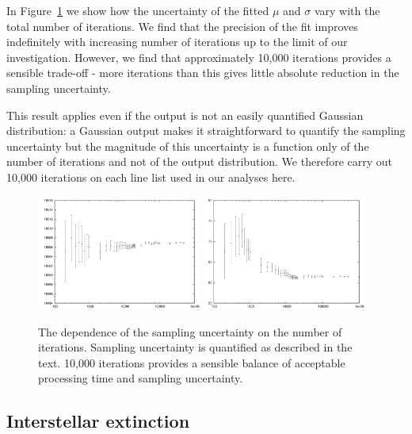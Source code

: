 \documentclass[useAMS,usenatbib]{mn2e}
\begin{document}
In Figure~\ref{samplefigure1} we show how the uncertainty of the fitted $\mu$ and $\sigma$ vary with the total number of iterations.  We find that the precision of the fit improves indefinitely with increasing number of iterations up to the limit of our investigation.  However, we find that approximately 10,000 iterations provides a sensible trade-off - more iterations than this gives little absolute reduction in the sampling uncertainty.

This result applies even if the output is not an easily quantified Gaussian distribution: a Gaussian output makes it straightforward to quantify the sampling uncertainty but the magnitude of this uncertainty is a function only of the number of iterations and not of the output distribution.  We therefore carry out 10,000 iterations on each line list used in our analyses here.

\begin{figure}
\includegraphics[width=0.48\textwidth]{figures/mulogx.png}
\includegraphics[width=0.48\textwidth]{figures/sigmalogx.png}
\caption{The dependence of the sampling uncertainty on the number of iterations.  Sampling uncertainty is quantified as described in the text.  10,000 iterations provides a sensible balance of acceptable processing time and sampling uncertainty.}
\label{samplefigure1}
\end{figure}

\subsection{Interstellar extinction}
\end{document}

